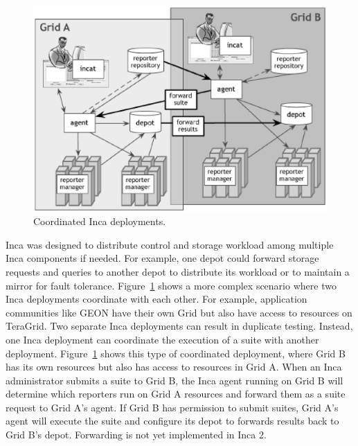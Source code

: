 \documentclass[times,10pt,twocolumn]{article}
\begin{document}
\begin{figure}[tbp]
  \centering
  \includegraphics[width=.6\textwidth]{vo.eps}
  \caption{\label{tg_coord_fig} Coordinated Inca deployments.}
\end{figure}

Inca was designed to distribute control and storage workload among
multiple Inca components if needed.  For example, one depot could forward
storage requests and queries to another depot to distribute its workload or to
maintain a mirror for fault tolerance.  Figure~\ref{tg_coord_fig} shows a more
complex scenario where two Inca deployments coordinate with each other.  For
example, application communities like GEON have their own Grid but also have
access to resources on TeraGrid.   Two separate Inca deployments can result in
duplicate testing. Instead, one Inca deployment can coordinate the execution
of a suite with another deployment.
Figure~\ref{tg_coord_fig} shows this type of coordinated deployment, where Grid B 
has its own resources but also has access to resources in Grid A.
When an Inca administrator submits a suite to Grid B, the Inca agent running
on Grid B will determine which reporters run on Grid A resources and forward
them as a suite request to Grid A's agent.  If Grid B has permission to submit
suites, Grid A's agent will execute the suite and configure its depot to
forwards results back to Grid B's depot.  Forwarding is not yet implemented 
in Inca 2.


\label{usecases}


\end{document}

